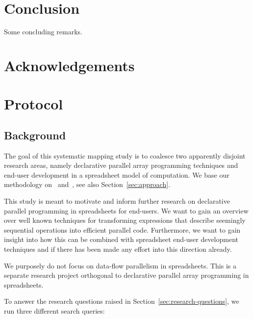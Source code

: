 \documentclass[a4paper]{article}
\begin{document}
\section{Conclusion}
\label{sec:conclusion}

Some concluding remarks. 

\section*{Acknowledgements}





\appendix

\newpage{}

\section{Protocol}
\label{sec:protocol}

\subsection{Background}
\label{sec:background}

The goal of this systematic mapping study is to coalesce two
apparently disjoint research areas, namely declarative parallel array
programming techniques and end-user development in a spreadsheet model
of computation. We base our methodology on~\citet{keele2007guidelines}
and~\citet{petersen2008systematic}, see also
Section~\ref{sec:approach}.

This study is meant to motivate and inform further research on
declarative parallel programming in spreadsheets for end-users. We
want to gain an overview over well known techniques for transforming
expressions that describe seemingly sequential operations into
efficient parallel code. Furthermore, we want to gain insight into how
this can be combined with spreadsheet end-user development techniques
and if there has been made any effort into this direction
already.

We purposely do not focus on data-flow parallelism in
spreadsheets. This is a separate research project orthogonal to
declarative parallel array programming in spreadsheets.

To answer the research questions raised in
Section~\ref{sec:research-questions}, we run three different search
queries:
\end{document}
